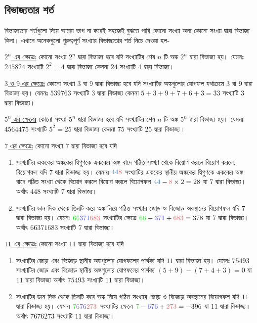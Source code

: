 \documentclass[a4paper,11pt]{article}
\begin{document}
\subsection{বিভাজ্যতার শর্ত}
বিভাজ্যতার শর্তগুলো দিয়ে আমরা ভাগ না করেই সহজেই বুঝতে পারি কোনো সংখ্যা অন্য কোনো সংখ্যা দ্বারা বিভাজ্য কিনা। এখানে অনেকগুলো গুরুত্বপূর্ণ সংখ্যার বিভাজ্যতার শর্ত নিচে দেওয়া হল-  

\underline{$2^n$ এর ক্ষেত্রেঃ} কোনো সংখ্যা $2^n$ দ্বারা বিভাজ্য হবে যদি সংখ্যাটির শেষ $n$ টি অঙ্ক $2^n$ দ্বারা বিভাজ্য হয়। যেমনঃ $245824$ সংখ্যাটি $2^2=4$ দ্বারা বিভাজ্য কেননা $24$ সংখ্যাটি $4$ দ্বারা বিভাজ্য। 

\underline{$3$ ও $9$ এর ক্ষেত্রেঃ} কোনো সংখ্যা $3$ বা $9$ দ্বারা বিভাজ্য হবে যদি সংখ্যাটির অঙ্কগুলোর যোগফল যথাক্রমে $3$ বা $9$ দ্বারা বিভাজ্য হয়। যেমনঃ $539763$ সংখ্যাটি $3$ দ্বারা বিভাজ্য কেননা $5+3+9+7+6+3=33$ সংখ্যাটি $3$ দ্বারা বিভাজ্য। 

\underline{$5^n$ এর ক্ষেত্রেঃ} কোনো সংখ্যা $5^n$ দ্বারা বিভাজ্য হবে যদি সংখ্যাটির শেষ $n$ টি অঙ্ক $5^n$ দ্বারা বিভাজ্য হয়। যেমনঃ $4564475$ সংখ্যাটি $5^2=25$ দ্বারা বিভাজ্য কেননা $75$ সংখ্যাটি $25$ দ্বারা বিভাজ্য। 

\underline{$7$ এর ক্ষেত্রেঃ} কোনো সংখ্যা $7$ দ্বারা বিভাজ্য হবে যদি 
\begin{enumerate}[label=(\alph*),noitemsep]
	\item সংখ্যাটির এককের অঙ্ককের দ্বিগুণকে এককের অঙ্ক বাদে গঠিত সংখ্যা থেকে বিয়োগ করলে বিয়োগ করলে, বিয়োগফল যদি $7$ দ্বারা বিভাজ্য হয়। যেমনঃ $\textcolor{bleudefrance}{44}\textcolor{red!60}{8}$ সংখ্যাটির এককের স্থানীয় অঙ্ককের দ্বিগুণকে এককের অঙ্ক বাদে গঠিত সংখ্যা থেকে বিয়োগ করলে বিয়োগ করলে বিয়োগফল $\textcolor{bleudefrance}{44}-\textcolor{red!60}{8}\times 2=28$ যা $7$ দ্বারা বিভাজ্য। অর্থাৎ $448$ সংখ্যাটি $7$ দ্বারা বিভাজ্য।
	\item সংখ্যাটির ডান দিক থেকে তিনটি করে অঙ্ক নিয়ে গঠিত সংখ্যার জোড় ও বিজোড় অবস্থানের বিয়োগফল যদি $7$ দ্বারা বিভাজ্য হয়। যেমনঃ $\textcolor{green}{66}\textcolor{blue!70}{371}\textcolor{red!60}{683}$ সংখ্যাটির ক্ষেত্রে $\textcolor{green}{66}-\textcolor{blue!70}{371}+\textcolor{red!60}{683}=378$ যা $7$ দ্বারা বিভাজ্য। অর্থাৎ $66371683$ সংখ্যাটি $7$ দ্বারা বিভাজ্য।
\end{enumerate}

\underline{$11$ এর ক্ষেত্রেঃ} কোনো সংখ্যা $11$ দ্বারা বিভাজ্য হবে যদি
\begin{enumerate}[label=(\alph*),noitemsep]
	\item  সংখ্যাটির জোড় এবং বিজোড় স্থানীয় অঙ্কগুলোর যোগফলের পার্থক্য যদি $11$ দ্বারা বিভাজ্য হয়। যেমনঃ $75493$ সংখ্যাটির জোড় এবং বিজোড় স্থানীয় অঙ্কগুলোর যোগফলের পার্থক্য $(5+9)-(7+4+3)=0$ যা $11$ দ্বারা বিভাজ্য অর্থাৎ $75493$ সংখ্যাটি $11$ দ্বারা বিভাজ্য।
	\item সংখ্যাটির ডান দিক থেকে তিনটি করে অঙ্ক নিয়ে গঠিত সংখ্যার জোড় ও বিজোড় অবস্থানের বিয়োগফল যদি $11$ দ্বারা বিভাজ্য হয়। যেমনঃ $\textcolor{green}{7}\textcolor{blue!70}{676}\textcolor{red!60}{273}$ সংখ্যাটির ক্ষেত্রে $\textcolor{green}{7}-\textcolor{blue!70}{676}+\textcolor{red!60}{273}=-396$ যা $11$ দ্বারা বিভাজ্য। অর্থাৎ $7676273$ সংখ্যাটি $11$ দ্বারা বিভাজ্য।
\end{enumerate}
\end{document}
